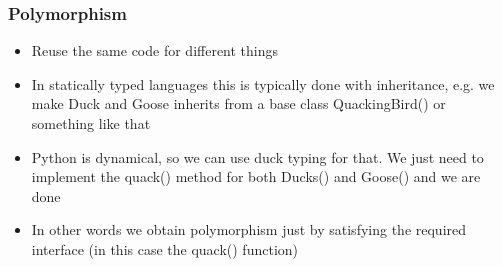 \documentclass[9pt]{beamer}
\begin{document}
\begin{frame}
  \frametitle{Polymorphism}

  \begin{itemize}
    \item Reuse the same code for different things
    \medskip
    \item In statically typed languages this is typically done with inheritance,
          e.g. we make Duck and Goose inherits from a base class QuackingBird()
          or something like that
    \medskip
    \item Python is dynamical, so we can use duck typing for that.
          We just need to implement the quack() method for both Ducks() and Goose()
          and we are done
    \medskip
    \item In other words we obtain polymorphism just by satisfying the required \alert{interface}
          (in this case the quack() function)
  \end{itemize}

\end{frame}
\end{document}
